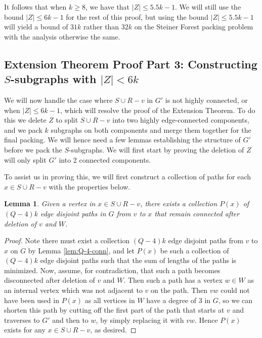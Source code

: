\documentclass{article}
\newtheorem{lemma}{Lemma}[section]
\begin{document}
It follows that when $k \geq 8$, we have that $|Z| \leq 5.5k-1$. We will still use the bound $|Z| \leq 6k-1$ for the rest of this proof, but using the bound $|Z| \leq 5.5k-1$ will yield a bound of $31k$ rather than $32k$ on the Steiner Forest packing problem with the analysis otherwise the same.

\subsection{Extension Theorem Proof Part 3: Constructing $S$-subgraphs with $|Z| < 6k$}

We will now handle the case where $S \cup R-v$ in $G'$ is not highly connected, or when $|Z| \leq 6k-1$, which will resolve the proof of the Extension Theorem. To do this we delete $Z$ to split $S \cup R-v$ into two highly edge-connected components, and we pack $k$ subgraphs on both components and merge them together for the final packing. We will hence need a few lemmas establishing the structure of $G'$ before we pack the $S$-subgraphs. We will first start by proving the deletion of $Z$ will only split $G'$ into 2 connected components. 

To assist us in proving this, we will first construct a collection of paths for each $x \in S \cup R-v$ with the properties below. 

\begin{lemma}\label{lem:P(x)}
    Given a vertex in $x \in S \cup R-v$, there exists a collection $P(x)$ of $(Q-4)k$ edge disjoint paths in $G$ from $v$ to $x$ that remain connected after deletion of $v$ and $W$.  
\end{lemma}

\begin{proof}
    Note there must exist a collection $(Q-4)k$ edge disjoint paths from $v$ to $x$ on $G$ by Lemma \ref{lem:Q-4-conn}, and let $P(x)$ be such a collection of $(Q-4)k$ edge disjoint paths such that the sum of lengths of the paths is minimized. Now, assume, for contradiction, that such a path becomes disconnected after deletion of $v$ and $W$. Then such a path has a vertex $w \in W$ as an internal vertex which was not adjacent to $v$ on the path. Then $vw$ could not have been used in $P(x)$ as all vertices in $W$ have a degree of 3 in $G$, so we can shorten this path by cutting off the first part of the path that starts at $v$ and traverses to $G'$ and then to $w$, by simply replacing it with $vw$. Hence $P(x)$ exists for any $x \in S \cup R-v$, as desired. 
\end{proof}
\end{document}
